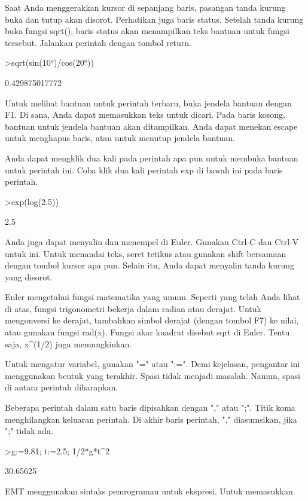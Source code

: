 \documentclass[a4paper,10pt]{article}
\begin{document}
\begin{eulernotebook}
\begin{eulercomment}
\begin{eulercomment}
\begin{eulercomment}
Saat Anda menggerakkan kursor di sepanjang baris, pasangan tanda
kurung buka dan tutup akan disorot. Perhatikan juga baris status.
Setelah tanda kurung buka fungsi sqrt(), baris status akan menampilkan
teks bantuan untuk fungsi tersebut. Jalankan perintah dengan tombol
return.
\end{eulercomment}
\begin{eulerprompt}
>sqrt(sin(10°)/cos(20°))
\end{eulerprompt}
\begin{euleroutput}
  0.429875017772
\end{euleroutput}
\begin{eulercomment}
Untuk melihat bantuan untuk perintah terbaru, buka jendela bantuan
dengan F1. Di sana, Anda dapat memasukkan teks untuk dicari. Pada
baris kosong, bantuan untuk jendela bantuan akan ditampilkan. Anda
dapat menekan escape untuk menghapus baris, atau untuk menutup jendela
bantuan.

Anda dapat mengklik dua kali pada perintah apa pun untuk membuka
bantuan untuk perintah ini. Coba klik dua kali perintah exp di bawah
ini pada baris perintah.
\end{eulercomment}
\begin{eulerprompt}
>exp(log(2.5))
\end{eulerprompt}
\begin{euleroutput}
  2.5
\end{euleroutput}
\begin{eulercomment}
Anda juga dapat menyalin dan menempel di Euler. Gunakan Ctrl-C dan
Ctrl-V untuk ini. Untuk menandai teks, seret tetikus atau gunakan
shift bersamaan dengan tombol kursor apa pun. Selain itu, Anda dapat
menyalin tanda kurung yang disorot.
\end{eulercomment}
\begin{eulercomment}
Euler mengetahui fungsi matematika yang umum. Seperti yang telah Anda
lihat di atas, fungsi trigonometri bekerja dalam radian atau derajat.
Untuk mengonversi ke derajat, tambahkan simbol derajat (dengan tombol
F7) ke nilai, atau gunakan fungsi rad(x). Fungsi akar kuadrat disebut
sqrt di Euler. Tentu saja, x\textasciicircum{}(1/2) juga memungkinkan.

Untuk mengatur variabel, gunakan "=" atau ":=". Demi kejelasan,
pengantar ini menggunakan bentuk yang terakhir. Spasi tidak menjadi
masalah. Namun, spasi di antara perintah diharapkan.

Beberapa perintah dalam satu baris dipisahkan dengan "," atau ";".
Titik koma menghilangkan keluaran perintah. Di akhir baris perintah,
"," diasumsikan, jika ";" tidak ada.
\end{eulercomment}
\begin{eulerprompt}
>g:=9.81; t:=2.5; 1/2*g*t^2
\end{eulerprompt}
\begin{euleroutput}
  30.65625
\end{euleroutput}
\begin{eulercomment}
EMT menggunakan sintaks pemrograman untuk ekspresi. Untuk memasukkan


\end{eulercomment}
\end{eulercomment}
\end{eulercomment}
\end{eulernotebook}
\end{document}
